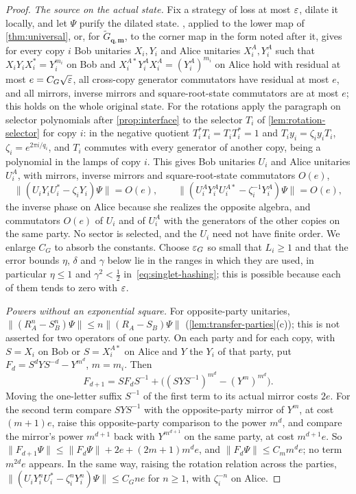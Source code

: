 \begin{proof}
\emph{The source on the actual state.} Fix a strategy of loss at most $\varepsilon$, dilate it locally, and let $\Psi$ purify the dilated state.
, applied to the lower map of \cref{thm:universal}, or, for $\widetilde G_{\mathbf q,\mathbf m}$, to the corner map in the form
noted after it, gives for every copy $i$ Bob unitaries $X_i,Y_i$ and Alice unitaries $X_i^A,Y_i^A$ such that
$X_iY_iX_i^*=Y_i^{m_i}$ on Bob and $X_i^{A*}Y_i^AX_i^A=(Y_i^A)^{m_i}$ on Alice hold with residual at most $e=C_G\sqrt{\varepsilon}$, all cross-copy
generator commutators have residual at most $e$, and all mirrors, inverse mirrors and square-root-state commutators are at most $e$; this
holds on the whole original state. For the rotations apply the paragraph on selector polynomials after \cref{prop:interface} to the selector
$T_i$ of \cref{lem:rotation-selector} for copy $i$: in the negative quotient $T_i^*T_i=T_iT_i^*=1$ and $T_iy_i=\zeta_iy_iT_i$,
$\zeta_i=e^{2\pi i/q_i}$, and $T_i$ commutes with every generator of another copy, being a polynomial in the lamps of copy $i$. This gives
Bob unitaries $U_i$ and Alice unitaries $U_i^A$, with mirrors, inverse mirrors and square-root-state commutators $O(e)$,
\[
\|(U_iY_iU_i^*-\zeta_iY_i)\Psi\|=O(e),\qquad\|(U_i^AY_i^AU_i^{A*}-\zeta_i^{-1}Y_i^A)\Psi\|=O(e),
\]
the inverse phase on Alice because she realizes the opposite algebra, and commutators $O(e)$ of $U_i$ and of $U_i^A$ with the generators
of the other copies on the same party. No sector is selected, and the $U_i$ need not have finite order. We enlarge $C_G$ to absorb the
constants. Choose $\varepsilon_G$ so small that $L_i\ge1$ and that the error bounds $\eta$, $\delta$ and $\gamma$ below lie in the ranges in
which they are used, in particular $\eta\le1$ and $\gamma^2<\frac12$ in~\eqref{eq:singlet-hashing}; this is possible because each of
them tends to zero with $\varepsilon$.

\emph{Powers without an exponential square.} For opposite-party unitaries, $\|(R_A^n-S_B^n)\Psi\|\le n\|(R_A-S_B)\Psi\|$
(\cref{lem:transfer-parties}(c)); this is not asserted for two operators of one party. On each party and for each copy, with $S=X_i$ on
Bob or $S=X_i^{A*}$ on Alice and $Y$ the $Y_i$ of that party, put $F_d=S^dYS^{-d}-Y^{m^d}$, $m=m_i$. Then
\[
F_{d+1}=SF_dS^{-1}+\bigl((SYS^{-1})^{m^d}-(Y^m)^{m^d}\bigr).
\]
Moving the one-letter suffix $S^{-1}$ of the first term to its actual mirror costs $2e$. For the second term compare $SYS^{-1}$ with the
opposite-party mirror of $Y^m$, at cost $(m+1)e$, raise this opposite-party comparison to the power $m^d$, and compare the mirror's power
$m^{d+1}$ back with $Y^{m^{d+1}}$ on the same party, at cost $m^{d+1}e$. So $\|F_{d+1}\Psi\|\le\|F_d\Psi\|+2e+(2m+1)m^de$, and
$\|F_d\Psi\|\le C_mm^de$; no term $m^{2d}e$ appears. In the same way, raising the rotation relation across the parties,
$\|(U_iY_i^nU_i^*-\zeta_i^nY_i^n)\Psi\|\le C_Gne$ for $n\ge1$, with $\zeta_i^{-n}$ on Alice.


\end{proof}
